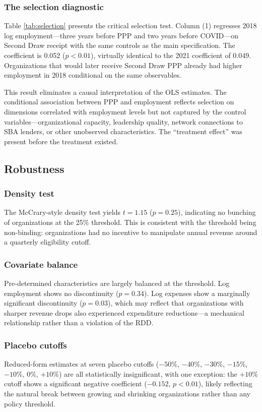 \documentclass[12pt]{article}
\begin{document}
\subsubsection*{The selection diagnostic} Table \ref{tab:selection} presents the critical selection test. Column (1) regresses 2018 log employment---three years before PPP and two years before COVID---on Second Draw receipt with the same controls as the main specification. The coefficient is 0.052 ($p < 0.01$), virtually identical to the 2021 coefficient of 0.049. Organizations that would later receive Second Draw PPP already had higher employment in 2018 conditional on the same observables.



This result eliminates a causal interpretation of the OLS estimates. The conditional association between PPP and employment reflects selection on dimensions correlated with employment levels but not captured by the control variables---organizational capacity, leadership quality, network connections to SBA lenders, or other unobserved characteristics. The ``treatment effect'' was present before the treatment existed.

\subsection{Robustness}

\subsubsection*{Density test} The McCrary-style density test yields $t = 1.15$ ($p = 0.25$), indicating no bunching of organizations at the 25\% threshold. This is consistent with the threshold being non-binding: organizations had no incentive to manipulate annual revenue around a quarterly eligibility cutoff.

\subsubsection*{Covariate balance} Pre-determined characteristics are largely balanced at the threshold. Log employment shows no discontinuity ($p = 0.34$). Log expenses show a marginally significant discontinuity ($p = 0.03$), which may reflect that organizations with sharper revenue drops also experienced expenditure reductions---a mechanical relationship rather than a violation of the RDD.

\subsubsection*{Placebo cutoffs} Reduced-form estimates at seven placebo cutoffs ($-50\%$, $-40\%$, $-30\%$, $-15\%$, $-10\%$, $0\%$, $+10\%$) are all statistically insignificant, with one exception: the $+10\%$ cutoff shows a significant negative coefficient ($-0.152$, $p < 0.01$), likely reflecting the natural break between growing and shrinking organizations rather than any policy threshold.
\end{document}
